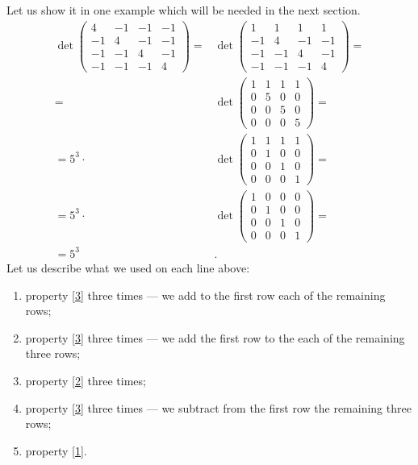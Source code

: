 Let us show it in one example which will be needed in the next section.
\begin{align*}
\det\left(
\begin{matrix}
4&-1&-1&-1
\\
-1&4&-1&-1
\\
-1&-1&4&-1
\\
-1&-1&-1&4
\end{matrix}
\right)
=
&\det\left(
\begin{matrix}
1&1&1&1
\\
-1&4&-1&-1
\\
-1&-1&4&-1
\\
-1&-1&-1&4
\end{matrix}
\right) 
=
\\
=
&\det\left(
\begin{matrix}
1&1&1&1
\\
0&5&0&0
\\
0&0&5&0
\\
0&0&0&5
\end{matrix}
\right)
=
\\
=
5^3\cdot
&\det\left(
\begin{matrix}
1&1&1&1
\\
0&1&0&0
\\
0&0&1&0
\\
0&0&0&1
\end{matrix}
\right)=
\\
=
5^3\cdot&\det\left(
\begin{matrix}
1&0&0&0
\\
0&1&0&0
\\
0&0&1&0
\\
0&0&0&1
\end{matrix}
\right)=
\\
=5^3&.
\end{align*}
Let us describe what we used on each line above:
\begin{enumerate}
\item property \ref{3} three times --- we add to the first row each of the remaining rows;
\item property \ref{3} three times --- we add the first row to the each of the remaining three rows;
\item property \ref{2} three times;
\item property \ref{3} three times --- we subtract from the first row the remaining three rows;
\item property \ref{1}.
\end{enumerate}


